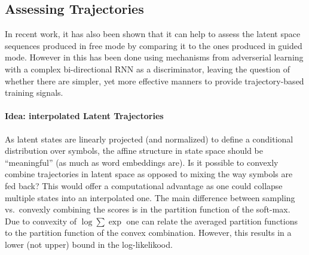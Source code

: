 \documentclass{article}
\begin{document}
\subsection{Assessing Trajectories}

In recent work, it has also been shown that it can help to assess the latent space sequences produced in free mode by comparing it to the ones produced in guided mode. However in \cite{lamb2016professor} this has been done using mechanisms from adverserial learning with a complex bi-directional RNN as a discriminator, leaving the question of whether there are simpler, yet more effective manners to provide trajectory-based training signals. 


\paragraph{Idea: interpolated Latent Trajectories}

As latent states are linearly projected (and normalized) to define a conditional distribution over symbols, the affine structure in state space should be ``meaningful'' (as much as word embeddings are).  Is it possible to convexly combine trajectories in latent space as opposed to mixing the way symbols are fed back? This would offer a computational advantage as one could collapse multiple states into an interpolated one. The main difference between sampling vs.~convexly combining the scores is in the partition function of the soft-max. Due to convexity of $\log \sum \exp$ one can relate the averaged partition functions to the partition function of the convex combination. However, this results in a lower (not upper) bound in the log-likelikood.



\end{document}
